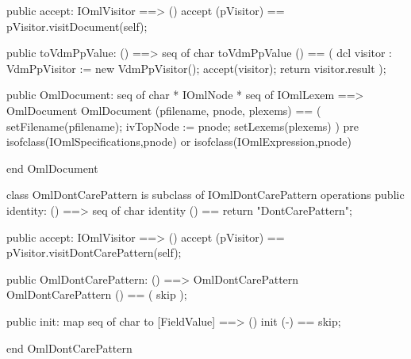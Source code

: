 \begin{vdm_al}
  public accept: IOmlVisitor ==> ()
  accept (pVisitor) == pVisitor.visitDocument(self);

  public toVdmPpValue: () ==> seq of char
  toVdmPpValue () ==
    ( dcl visitor : VdmPpVisitor := new VdmPpVisitor();
      accept(visitor);
      return visitor.result );

  public OmlDocument: seq of char * IOmlNode * seq of IOmlLexem ==> OmlDocument
  OmlDocument (pfilename, pnode, plexems) ==
    ( setFilename(pfilename);
      ivTopNode := pnode;
      setLexems(plexems) )
    pre isofclass(IOmlSpecifications,pnode) or isofclass(IOmlExpression,pnode)

end OmlDocument
\end{vdm_al}
\begin{vdm_al}
class OmlDontCarePattern is subclass of IOmlDontCarePattern
operations
  public identity: () ==> seq of char
  identity () == return "DontCarePattern";

  public accept: IOmlVisitor ==> ()
  accept (pVisitor) == pVisitor.visitDontCarePattern(self);

  public OmlDontCarePattern:
      () ==> OmlDontCarePattern
  OmlDontCarePattern () == 
    ( skip );

  public init: map seq of char to [FieldValue] ==> ()
  init (-) == skip;

end OmlDontCarePattern
\end{vdm_al}

